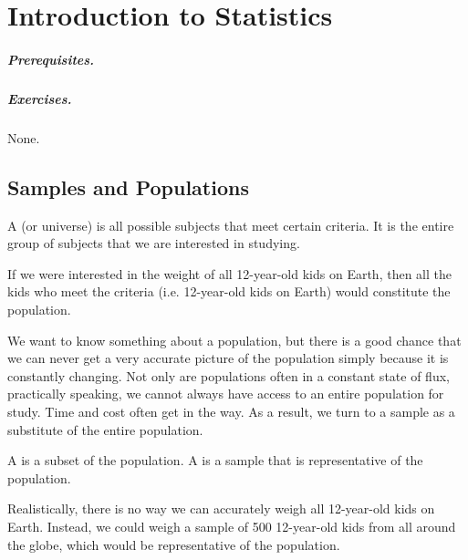\chapter{Introduction to Statistics}

\paragraph{Prerequisites.} 
\paragraph{Exercises.} None.

\section{Samples and Populations}

\begin{definition}
    A  (or universe) is all possible subjects that meet certain criteria. It is the entire group of subjects that we are interested in studying.
\end{definition}

\begin{example}[Population]
    If we were interested in the weight of all 12-year-old kids on Earth, then all the kids who meet the criteria (i.e. 12-year-old kids on Earth) would constitute the population.
\end{example}

We want to know something about a population, but there is a good chance that we can never get a very accurate picture of the population simply because it is constantly changing. Not only are populations often in a constant state of flux, practically speaking, we cannot always have access to an entire population for study. Time and cost often get in the way. As a result, we turn to a sample as a substitute of the entire population.

\begin{definition}
    A  is a subset of the population. A  is a sample that is representative of the population.
\end{definition}

\begin{example}[Sample]
    Realistically, there is no way we can accurately weigh all 12-year-old kids on Earth. Instead, we could weigh a sample of 500 12-year-old kids from all around the globe, which would be representative of the population.
\end{example}

